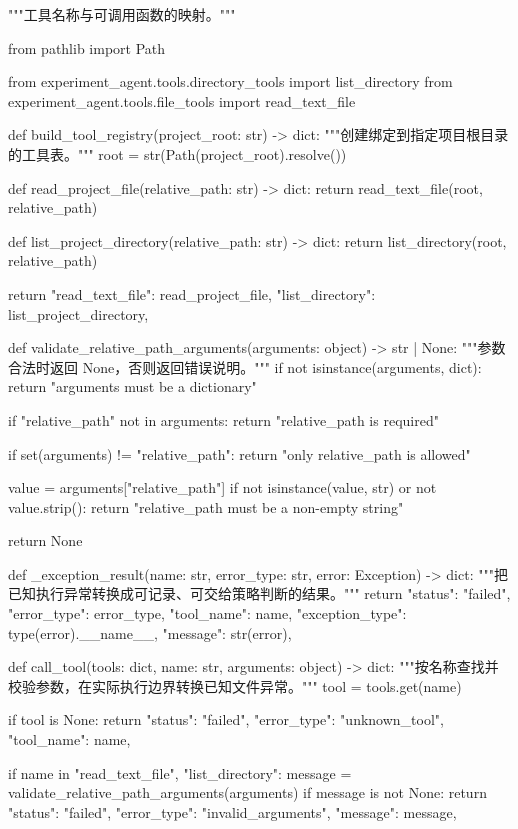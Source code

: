 \documentclass[UTF8,zihao=-4,fontset=fandol]{ctexart}
\begin{document}
\begin{Code}
"""工具名称与可调用函数的映射。"""

from pathlib import Path

from experiment_agent.tools.directory_tools import list_directory
from experiment_agent.tools.file_tools import read_text_file


def build_tool_registry(project_root: str) -> dict:
    """创建绑定到指定项目根目录的工具表。"""
    root = str(Path(project_root).resolve())

    def read_project_file(relative_path: str) -> dict:
        return read_text_file(root, relative_path)

    def list_project_directory(relative_path: str) -> dict:
        return list_directory(root, relative_path)

    return {
        "read_text_file": read_project_file,
        "list_directory": list_project_directory,
    }


def validate_relative_path_arguments(arguments: object) -> str | None:
    """参数合法时返回 None，否则返回错误说明。"""
    if not isinstance(arguments, dict):
        return "arguments must be a dictionary"

    if "relative_path" not in arguments:
        return "relative_path is required"

    if set(arguments) != {"relative_path"}:
        return "only relative_path is allowed"

    value = arguments["relative_path"]
    if not isinstance(value, str) or not value.strip():
        return "relative_path must be a non-empty string"

    return None


def _exception_result(name: str, error_type: str, error: Exception) -> dict:
    """把已知执行异常转换成可记录、可交给策略判断的结果。"""
    return {
        "status": "failed",
        "error_type": error_type,
        "tool_name": name,
        "exception_type": type(error).__name__,
        "message": str(error),
    }


def call_tool(tools: dict, name: str, arguments: object) -> dict:
    """按名称查找并校验参数，在实际执行边界转换已知文件异常。"""
    tool = tools.get(name)

    if tool is None:
        return {
            "status": "failed",
            "error_type": "unknown_tool",
            "tool_name": name,
        }

    if name in {"read_text_file", "list_directory"}:
        message = validate_relative_path_arguments(arguments)
        if message is not None:
            return {
                "status": "failed",
                "error_type": "invalid_arguments",
                "message": message,
            }


\end{Code}
\end{document}
